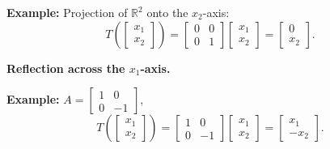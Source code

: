 \documentclass{article}
\begin{document}
\bigskip

\textbf{Example:} Projection of $\mathbb{R}^2$ onto the $x_2$-axis:
\[
T\left( \begin{bmatrix} x_1 \\ x_2 \end{bmatrix} \right) = \begin{bmatrix} 0 & 0 \\ 0 & 1 \end{bmatrix} \begin{bmatrix} x_1 \\ x_2 \end{bmatrix} = \begin{bmatrix} 0 \\ x_2 \end{bmatrix}.
\]

\bigskip

\textbf{Reflection across the $x_1$-axis.}

\medskip

\textbf{Example:} $A = \begin{bmatrix} 1 & 0 \\ 0 & -1 \end{bmatrix}$,
\[
T\left( \begin{bmatrix} x_1 \\ x_2 \end{bmatrix} \right) = \begin{bmatrix} 1 & 0 \\ 0 & -1 \end{bmatrix} \begin{bmatrix} x_1 \\ x_2 \end{bmatrix} = \begin{bmatrix} x_1 \\ -x_2 \end{bmatrix}.
\]

\begin{center}
\end{center}
\end{document}
